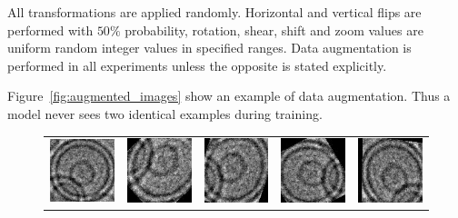 \documentclass[a4paper, 11pt, table]{article}
\begin{document}
All transformations are applied randomly. Horizontal and vertical flips are performed with $50\%$ probability, rotation, shear, shift and zoom values are uniform random integer values in specified ranges. Data augmentation is performed in all experiments unless the opposite is stated explicitly.

Figure~\ref{fig:augmented_images} show an example of data augmentation. Thus a model never sees two identical examples during training.

\begin{figure}[H]
\centering
\begin{tabular}{ccccc}
\includegraphics[scale=0.5]{augmented/541253.jpg} & \includegraphics[scale=0.5]{augmented/_0_645.jpeg} & \includegraphics[scale=0.5]{augmented/_0_1385.jpeg} & \includegraphics[scale=0.5]{augmented/_0_1749.jpeg} & \includegraphics[scale=0.5]{augmented/_0_2343.jpeg} \\


\end{tabular}
\end{figure}
\end{document}

